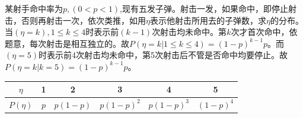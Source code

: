 \begin{frame}
\begin{example}
	某射手命中率为$p,(0<p<1)$,现有五发子弹。射击一发，如果命中，即停止射击，否则再射击一次，依次类推，如用$\eta$表示他射击所用去的子弹数，求$\eta$的分布。\\
	当$(\eta=k),1\le k\le 4$时表示前$(k-1)$次射击均未命中。第$k$次才首次命中，依题意，每次射击是相互独立的。故$P(\eta=k| 1\le k\le 4)=(1-p)^{k-1}p$。而$(\eta=5)$时表示前4次射击均未命中，第5次射击后不管是否命中均要停止。故$P(\eta=k|k=5)=(1-p)^{k-1}p$。\\
	\begin{tabular}{|c|c|c|c|c|c|}
		\hline 
		$\eta$ & 1 & 2 & 3 & 4 & 5\\ 
		\hline 
		$P(\eta)$ & $p$ & $p(1-p)$ & $p(1-p)^2$ & $p(1-p)^3$  & $(1-p)^4$ \\ 
		\hline 
	\end{tabular} 
\end{example}
\end{frame}

\fi　　　%

